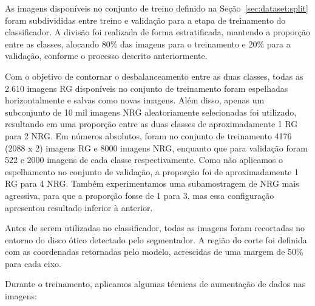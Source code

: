 \documentclass[12pt]{article}
\begin{document}
As imagens disponíveis no conjunto de treino definido na Seção~\ref{sec:dataset:split} foram subdivididas entre treino e validação para a etapa de treinamento do classificador. A divisão foi realizada de forma estratificada, mantendo a proporção entre as classes, alocando 80\% das imagens para o treinamento e 20\% para a validação, conforme o processo descrito anteriormente.



Com o objetivo de contornar o desbalanceamento entre as duas classes, todas as 2.610 imagens RG disponíveis no conjunto de treinamento foram espelhadas horizontalmente e salvas como novas imagens. Além disso, apenas um subconjunto de 10 mil imagens NRG aleatoriamente selecionadas foi utilizado, resultando em uma proporção entre as duas classes de aproximadamente 1 RG para 2 NRG. Em números absolutos, foram no conjunto de treinamento 4176 (2088 x 2) imagens RG e 8000 imagens NRG, enquanto que para validação foram 522 e 2000 imagens de cada classe respectivamente. Como não aplicamos o espelhamento no conjunto de validação, a proporção foi de aproximadamente 1 RG para 4 NRG. Também experimentamos uma subamostragem de NRG mais agressiva, para que a proporção fosse de 1 para 3, mas essa configuração apresentou resultado inferior à anterior.

Antes de serem utilizadas no classificador, todas as imagens foram recortadas no entorno do disco ótico detectado pelo segmentador. A região do corte foi definida com as coordenadas retornadas pelo modelo, acrescidas de uma margem de 50\% para cada eixo.


Durante o treinamento, aplicamos algumas técnicas de aumentação de dados nas imagens:
\end{document}
